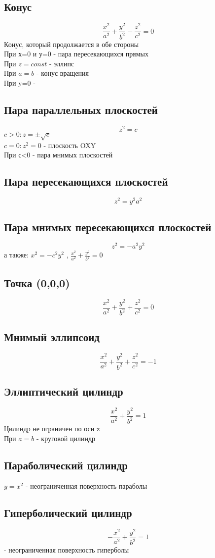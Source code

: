 \subsection{Конус}
$$\frac{x^2}{a^2}+\frac{y^2}{b^2}-\frac{z^2}{c^2}=0$$
Конус, который продолжается в обе стороны\\
При х=0 и у=0 - пара пересекающихся прямых\\
При $z=const$ - эллипс\\
При $a=b$ - конус вращения\\
При y=0 - 
\subsection{Пара параллельных плоскостей}
$$z^2=c$$
$c>0\colon z=\pm\sqrt{c}$\\
$c=0\colon z^2=0$ - плоскость OXY\\
При с<0 - пара мнимых плоскостей
\subsection{Пара пересекающихся плоскостей}
$$z^2=y^2a^2$$
\subsection{Пара мнимых пересекающихся плоскостей}
$$z^2=-a^2y^2$$
 а также: $x^2=-c^2y^2$ , $\frac{x^2}{a^2}+\frac{y^2}{b^2}=0$
\subsection{Точка (0,0,0)}
$$\frac{x^2}{a^2}+\frac{y^2}{b^2}+\frac{z^2}{c^2}=0$$
\subsection{Мнимый эллипсоид}
$$\frac{x^2}{a^2}+\frac{y^2}{b^2}+\frac{z^2}{c^2}=-1$$
\subsection{Эллиптический цилиндр}
$$\frac{x^2}{a^2}+\frac{y^2}{b^2}=1$$
Цилиндр не ограничен по оси z\\
При $a=b$ - круговой цилиндр
\subsection{Параболический цилиндр}
$y=x^2$
- неограниченная поверхность параболы
\subsection{Гиперболический цилиндр}
$$-\frac{x^2}{a^2}+\frac{y^2}{b^2}=1$$
- неограниченная поверхность гиперболы


